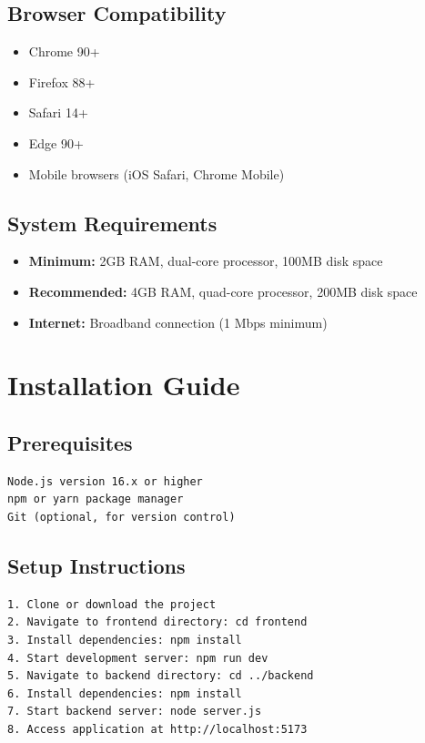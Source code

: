 \documentclass[12pt,a4paper]{article}
\begin{document}
\begin{itemize}
\subsection{Browser Compatibility}
\begin{itemize}
    \item Chrome 90+
    \item Firefox 88+
    \item Safari 14+
    \item Edge 90+
    \item Mobile browsers (iOS Safari, Chrome Mobile)
\end{itemize}

\subsection{System Requirements}
\begin{itemize}
    \item \textbf{Minimum:} 2GB RAM, dual-core processor, 100MB disk space
    \item \textbf{Recommended:} 4GB RAM, quad-core processor, 200MB disk space
    \item \textbf{Internet:} Broadband connection (1 Mbps minimum)
\end{itemize}

\section{Installation Guide}

\subsection{Prerequisites}
\begin{verbatim}
Node.js version 16.x or higher
npm or yarn package manager
Git (optional, for version control)
\end{verbatim}

\subsection{Setup Instructions}
\begin{verbatim}
1. Clone or download the project
2. Navigate to frontend directory: cd frontend
3. Install dependencies: npm install
4. Start development server: npm run dev
5. Navigate to backend directory: cd ../backend
6. Install dependencies: npm install
7. Start backend server: node server.js
8. Access application at http://localhost:5173
\end{verbatim}


\end{itemize}
\end{document}
